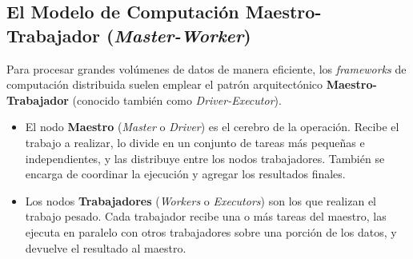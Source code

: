 \subsection{El Modelo de Computación Maestro-Trabajador (\textit{Master-Worker})}
Para procesar grandes volúmenes de datos de manera eficiente, los \textit{frameworks} de computación distribuida suelen emplear el patrón arquitectónico \textbf{Maestro-Trabajador} (conocido también como \textit{Driver-Executor}).
\begin{itemize}
    \item El nodo \textbf{Maestro} (\textit{Master} o \textit{Driver}) es el cerebro de la operación. Recibe el trabajo a realizar, lo divide en un conjunto de tareas más pequeñas e independientes, y las distribuye entre los nodos trabajadores. También se encarga de coordinar la ejecución y agregar los resultados finales.
    \item Los nodos \textbf{Trabajadores} (\textit{Workers} o \textit{Executors}) son los que realizan el trabajo pesado. Cada trabajador recibe una o más tareas del maestro, las ejecuta en paralelo con otros trabajadores sobre una porción de los datos, y devuelve el resultado al maestro.
\end{itemize}
